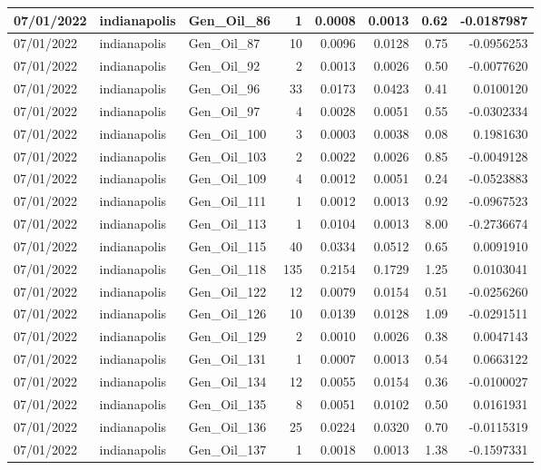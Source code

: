 \documentclass[
  letterpaper,
  DIV=11,
  numbers=noendperiod]{scrartcl}
\begin{document}
\begin{tabular}{l|l|l|r|r|r|r|r}
\hline
07/01/2022 & indianapolis & Gen\_Oil\_86 & 1 & 0.0008 & 0.0013 & 0.62 & -0.0187987\\
\hline
07/01/2022 & indianapolis & Gen\_Oil\_87 & 10 & 0.0096 & 0.0128 & 0.75 & -0.0956253\\
\hline
07/01/2022 & indianapolis & Gen\_Oil\_92 & 2 & 0.0013 & 0.0026 & 0.50 & -0.0077620\\
\hline
07/01/2022 & indianapolis & Gen\_Oil\_96 & 33 & 0.0173 & 0.0423 & 0.41 & 0.0100120\\
\hline
07/01/2022 & indianapolis & Gen\_Oil\_97 & 4 & 0.0028 & 0.0051 & 0.55 & -0.0302334\\
\hline
07/01/2022 & indianapolis & Gen\_Oil\_100 & 3 & 0.0003 & 0.0038 & 0.08 & 0.1981630\\
\hline
07/01/2022 & indianapolis & Gen\_Oil\_103 & 2 & 0.0022 & 0.0026 & 0.85 & -0.0049128\\
\hline
07/01/2022 & indianapolis & Gen\_Oil\_109 & 4 & 0.0012 & 0.0051 & 0.24 & -0.0523883\\
\hline
07/01/2022 & indianapolis & Gen\_Oil\_111 & 1 & 0.0012 & 0.0013 & 0.92 & -0.0967523\\
\hline
07/01/2022 & indianapolis & Gen\_Oil\_113 & 1 & 0.0104 & 0.0013 & 8.00 & -0.2736674\\
\hline
07/01/2022 & indianapolis & Gen\_Oil\_115 & 40 & 0.0334 & 0.0512 & 0.65 & 0.0091910\\
\hline
07/01/2022 & indianapolis & Gen\_Oil\_118 & 135 & 0.2154 & 0.1729 & 1.25 & 0.0103041\\
\hline
07/01/2022 & indianapolis & Gen\_Oil\_122 & 12 & 0.0079 & 0.0154 & 0.51 & -0.0256260\\
\hline
07/01/2022 & indianapolis & Gen\_Oil\_126 & 10 & 0.0139 & 0.0128 & 1.09 & -0.0291511\\
\hline
07/01/2022 & indianapolis & Gen\_Oil\_129 & 2 & 0.0010 & 0.0026 & 0.38 & 0.0047143\\
\hline
07/01/2022 & indianapolis & Gen\_Oil\_131 & 1 & 0.0007 & 0.0013 & 0.54 & 0.0663122\\
\hline
07/01/2022 & indianapolis & Gen\_Oil\_134 & 12 & 0.0055 & 0.0154 & 0.36 & -0.0100027\\
\hline
07/01/2022 & indianapolis & Gen\_Oil\_135 & 8 & 0.0051 & 0.0102 & 0.50 & 0.0161931\\
\hline
07/01/2022 & indianapolis & Gen\_Oil\_136 & 25 & 0.0224 & 0.0320 & 0.70 & -0.0115319\\
\hline
07/01/2022 & indianapolis & Gen\_Oil\_137 & 1 & 0.0018 & 0.0013 & 1.38 & -0.1597331\\

\end{tabular}
\end{document}
